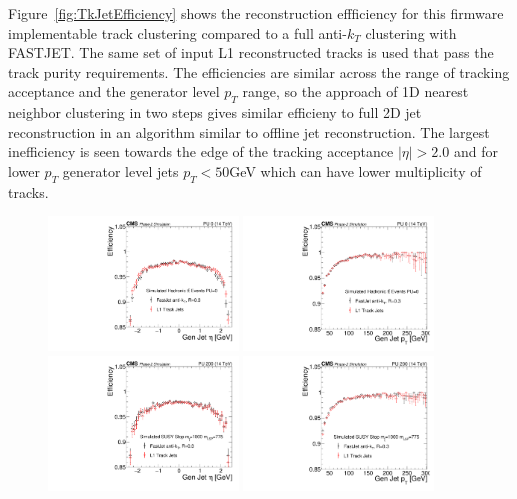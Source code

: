 Figure~\ref{fig:TkJetEfficiency} shows the reconstruction effficiency for this firmware implementable track clustering compared to a full anti-$k_{T}$ clustering with FASTJET. The same set of input L1 reconstructed tracks is used that pass the track purity requirements. The efficiencies are similar across the range of tracking acceptance and the generator level $p_{T}$ range, so the approach of 1D nearest neighbor clustering in two steps gives similar efficieny to full 2D jet reconstruction in an algorithm similar to offline jet reconstruction. The largest inefficiency is seen towards the edge of the tracking acceptance $\vert\eta\vert>2.0$ and for lower $p_{T}$ generator level jets $p_{T}<50$GeV which can have lower multiplicity of tracks.  

\begin{figure}[htbp!]
\includegraphics[width=0.45\textwidth ]{NoPUTTBarEff.pdf}
\includegraphics[width=0.45\textwidth]{NoPUTTBarPtEff.pdf}\\
\includegraphics[width=0.45\textwidth]{StopSamplePUEtaEff.pdf}
\includegraphics[width=0.45\textwidth]{StopSamplePUPtEff.pdf}

\end{figure}
